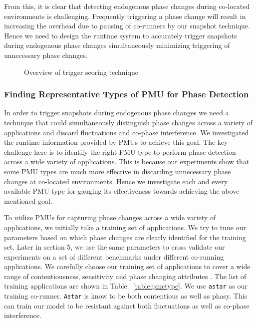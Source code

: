 \documentclass{sig-alternate}
\begin{document}
From this, it is clear that detecting endogenous phase changes during co-located environments is challenging. Frequently triggering a phase change will result in increasing the overhead due to pausing of co-runners by our snapshot technique. Hence we need to design the runtime system to accurately trigger snapshots during endogenous phase changes simultaneously minimizing triggering of unnecessary phase changes.
\begin{figure*}
\centering
\begin{minipage}[t]{2\columnwidth}
\centering
{}
\caption{Overview of trigger scoring technique}
\label{fig:triggerscoring}
\end{minipage}
\end{figure*}
\subsubsection{Finding Representative Types of PMU for Phase Detection}
\label{subsubsec:FindingRepresentativeTypesofPMUforPhaseDetection}

In order to trigger snapshots during endogenous phase changes we need a technique that could simultaneously distinguish phase changes across a variety of applications and discard fluctuations and co-phase interference. We investigated the runtime information provided by PMUs to achieve this goal. The key challenge here is to identify the right PMU type to perform phase detection across a wide variety of applications. This is because our experiments show that some PMU types are much more effective in discarding unnecessary phase changes at co-located environments. Hence we investigate each and every available PMU type for gauging its effectiveness towards achieving the above mentioned goal.

To utilize PMUs for capturing phase changes across a wide variety of applications, we initially take a training set of applications. We try to tune our parameters based on which phase changes are clearly identified for the training set. Later in section 5, we use the same parameters to cross validate our experiments on a set of different benchmarks under different co-running applications. We carefully choose our training set of applications to cover a wide range of contentiousness, sensitivity and phase changing attributes \cite{Tang:2011:CVS:2000417.2000419}. The list of training applications are shown in Table ~\ref{table:pmctype}. We use \texttt{astar} as our training co-runner. \texttt{Astar} is know to be both contentious as well as phasy. This can train our model to be resistant against both fluctuations as well as co-phase interference. 
\end{document}
